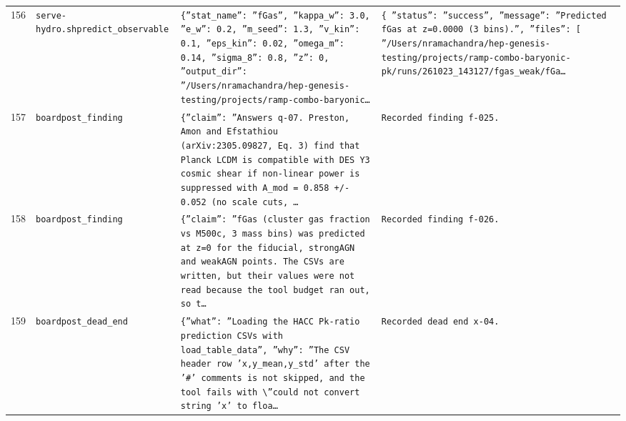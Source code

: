 \documentclass[11pt,a4paper]{article}
\begin{document}
\begin{longtable}{@{}p{}p{}p{}p{}@{}}
156 & \texttt{serve-hydro.sh}\newline\texttt{predict\_\allowbreak{}observable} & \texttt{\{''stat\_\allowbreak{}name'':\allowbreak{} ''fGas'',\allowbreak{} ''kappa\_\allowbreak{}w'':\allowbreak{} 3.0,\allowbreak{} ''e\_\allowbreak{}w'':\allowbreak{} 0.2,\allowbreak{} ''m\_\allowbreak{}seed'':\allowbreak{} 1.3,\allowbreak{} ''v\_\allowbreak{}kin'':\allowbreak{} 0.1,\allowbreak{} ''eps\_\allowbreak{}kin'':\allowbreak{} 0.02,\allowbreak{} ''omega\_\allowbreak{}m'':\allowbreak{} 0.14,\allowbreak{} ''sigma\_\allowbreak{}8'':\allowbreak{} 0.8,\allowbreak{} ''z'':\allowbreak{} 0,\allowbreak{} ''output\_\allowbreak{}dir'':\allowbreak{} ''/\allowbreak{}Users/\allowbreak{}nramachandra/\allowbreak{}hep-genesis-testing/\allowbreak{}projects/\allowbreak{}ramp-combo-baryonic\ldots{}\allowbreak{}} & \texttt{\{   ''status'':\allowbreak{} ''success'',\allowbreak{}   ''message'':\allowbreak{} ''Predicted fGas at z=\allowbreak{}0.0000 (3 bins)\allowbreak{}.'',\allowbreak{}   ''files'':\allowbreak{} [     ''/\allowbreak{}Users/\allowbreak{}nramachandra/\allowbreak{}hep-genesis-testing/\allowbreak{}projects/\allowbreak{}ramp-combo-baryonic-pk/\allowbreak{}runs/\allowbreak{}261023\_\allowbreak{}143127/\allowbreak{}fgas\_\allowbreak{}weak/\allowbreak{}fGa\ldots{}\allowbreak{}} \\
157 & \texttt{board}\newline\texttt{post\_\allowbreak{}finding} & \texttt{\{''claim'':\allowbreak{} ''Answers q-07. Preston,\allowbreak{} Amon and Efstathiou (arXiv:\allowbreak{}2305.09827,\allowbreak{} Eq. 3)\allowbreak{} find that Planck LCDM is compatible with DES Y3 cosmic shear if non-linear power is suppressed with A\_\allowbreak{}mod =\allowbreak{} 0.858 +/\allowbreak{}- 0.052 (no scale cuts,\allowbreak{} \ldots{}\allowbreak{}} & \texttt{Recorded finding f-025.} \\
158 & \texttt{board}\newline\texttt{post\_\allowbreak{}finding} & \texttt{\{''claim'':\allowbreak{} ''fGas (cluster gas fraction vs M500c,\allowbreak{} 3 mass bins)\allowbreak{} was predicted at z=\allowbreak{}0 for the fiducial,\allowbreak{} strongAGN and weakAGN points. The CSVs are written,\allowbreak{} but their values were not read because the tool budget ran out,\allowbreak{} so t\ldots{}\allowbreak{}} & \texttt{Recorded finding f-026.} \\
159 & \texttt{board}\newline\texttt{post\_\allowbreak{}dead\_\allowbreak{}end} & \texttt{\{''what'':\allowbreak{} ''Loading the HACC Pk-ratio prediction CSVs with load\_\allowbreak{}table\_\allowbreak{}data'',\allowbreak{} ''why'':\allowbreak{} ''The CSV header row 'x,\allowbreak{}y\_\allowbreak{}mean,\allowbreak{}y\_\allowbreak{}std' after the '\#' comments is not skipped,\allowbreak{} and the tool fails with \textbackslash{}\allowbreak{}''could not convert string 'x' to floa\ldots{}\allowbreak{}} & \texttt{Recorded dead end x-04.} \\

\end{longtable}
\end{document}

